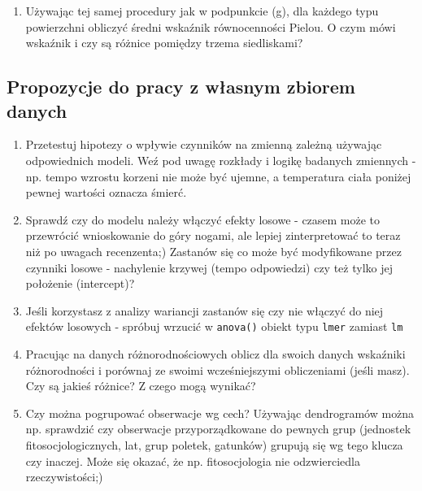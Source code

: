 \documentclass[]{article}
\providecommand{\tightlist}{%
  \setlength{\itemsep}{0pt}\setlength{\parskip}{0pt}}
\begin{document}
\begin{enumerate}
\def\labelenumi{\alph{enumi})}
\setcounter{enumi}{7}
\tightlist
\item
  Używając tej samej procedury jak w podpunkcie (g), dla każdego typu
  powierzchni obliczyć średni wskaźnik równocenności Pielou. O czym mówi
  wskaźnik i czy są różnice pomiędzy trzema siedliskami?
\end{enumerate}

\subsection{Propozycje do pracy z własnym zbiorem
danych}\label{propozycje-do-pracy-z-wasnym-zbiorem-danych}

\begin{enumerate}
\def\labelenumi{\arabic{enumi}.}
\setcounter{enumi}{9}
\tightlist
\item
  Przetestuj hipotezy o wpływie czynników na zmienną zależną używając
  odpowiednich modeli. Weź pod uwagę rozkłady i logikę badanych
  zmiennych - np. tempo wzrostu korzeni nie może być ujemne, a
  temperatura ciała poniżej pewnej wartości oznacza śmierć.
\item
  Sprawdź czy do modelu należy włączyć efekty losowe - czasem może to
  przewrócić wnioskowanie do góry nogami, ale lepiej zinterpretować to
  teraz niż po uwagach recenzenta;) Zastanów się co może być
  modyfikowane przez czynniki losowe - nachylenie krzywej (tempo
  odpowiedzi) czy też tylko jej położenie (intercept)?
\item
  Jeśli korzystasz z analizy wariancji zastanów się czy nie włączyć do
  niej efektów losowych - spróbuj wrzucić w \texttt{anova()} obiekt typu
  \texttt{lmer} zamiast \texttt{lm}
\item
  Pracując na danych różnorodnościowych oblicz dla swoich danych
  wskaźniki różnorodności i porównaj ze swoimi wcześniejszymi
  obliczeniami (jeśli masz). Czy są jakieś różnice? Z czego mogą
  wynikać?
\item
  Czy można pogrupować obserwacje wg cech? Używając dendrogramów można
  np. sprawdzić czy obserwacje przyporządkowane do pewnych grup
  (jednostek fitosocjologicznych, lat, grup poletek, gatunków) grupują
  się wg tego klucza czy inaczej. Może się okazać, że np. fitosocjologia
  nie odzwierciedla rzeczywistości;)
\end{enumerate}
\end{document}

